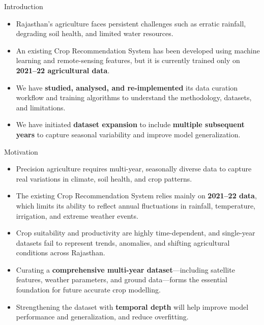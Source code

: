 \documentclass[aspectratio=169]{beamer}
\begin{document}

\begin{frame}{Introduction}
\begin{itemize}
    \item Rajasthan’s agriculture faces persistent challenges such as erratic rainfall, degrading soil health, and limited water resources.
    
    \item An existing Crop Recommendation System has been developed using machine learning and remote-sensing features, but it is currently trained only on \textbf{2021–22 agricultural data}.
    
    \item We have \textbf{studied, analysed, and re-implemented} its data curation workflow and training algorithms to understand the methodology, datasets, and limitations.
    
    \item We have initiated \textbf{dataset expansion} to include \textbf{multiple subsequent years} to capture seasonal variability and improve model generalization.
\end{itemize}
\end{frame}


\begin{frame}{Motivation}
\begin{itemize}
    \item Precision agriculture requires multi-year, seasonally diverse data to capture real variations in climate, soil health, and crop patterns.

    \item The existing Crop Recommendation System relies mainly on \textbf{2021–22 data}, which limits its ability to reflect annual fluctuations in rainfall, temperature, irrigation, and extreme weather events.

    \item Crop suitability and productivity are highly time-dependent, and single-year datasets fail to represent trends, anomalies, and shifting agricultural conditions across Rajasthan.

    \item Curating a \textbf{comprehensive multi-year dataset}—including satellite features, weather parameters, and ground data—forms the essential foundation for future accurate crop modelling.

    \item Strengthening the dataset with \textbf{temporal depth} will help improve model performance and generalization, and reduce overfitting.
\end{itemize}
\end{frame}
\end{document}
